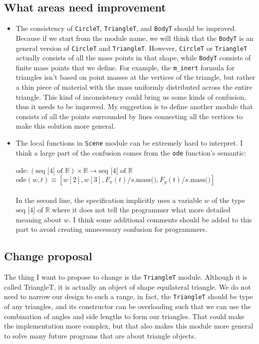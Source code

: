 \documentclass[12pt]{article}
\begin{document}
\subsection{What areas need improvement}
\begin{itemize}
\item The consistency of \verb|CircleT|, \verb|TriangleT|, and \verb|BodyT| should be improved. Because if we start from the module name, we will think that the \verb|BodyT| is an general version of \verb|CircleT| and \verb|TriangleT|. However, \verb|CircleT| or \verb|TriangleT| actually consists of all the mass points in that shape, while \verb|BodyT| consists of finite mass points that we define. For example, the \verb|m_inert| formula for triangles isn't based on point masses at the vertices of the triangle, but rather a thin piece of material with the mass uniformly distributed across the entire triangle. This kind of inconsistency could bring us some kinds of confusion, thus it needs to be improved. My suggestion is to define another module that consists of all the points surrounded by lines connecting all the vertices to make this solution more general.

\item The local functions in \verb|Scene| module can be extremely hard to interpret. I think a large part of the confusion comes from the \verb|ode| function's semantic:\\\\
\noindent $\text{ode}: (\text{seq [4] of } \mathbb{R}) \times \mathbb{R}
\rightarrow \text{seq [4] of } \mathbb{R}$\\
\noindent $\text{ode}(w, t) \equiv [w[2], w[3], F_x(t)/s.\text{mass()}, F_y(t)/s.\text{mass()}]$\\\\
In the second line, the specification implicitly uses a variable $w$ of the type $\text{seq [4] of } \mathbb{R}$ where it does not tell the programmer what more detailed meaning about $w$. I think some additional comments should be added to this part to avoid creating unnecessary confusion for programmers.
\end{itemize}
\subsection{Change proposal}
The thing I want to propose to change is the \verb|TriangleT| module. Although it is called TriangleT, it is actually an object of shape equilateral triangle. We do not need to narrow our design to such a range, in fact, the \verb|TriangleT| should be type of any triangles, and its constructor can be overloading such that we can use the combination of angles and side lengths to form our triangles. That could make the implementation more complex, but that also makes this module more general to solve many future programs that are about triangle objects.
\end{document}
